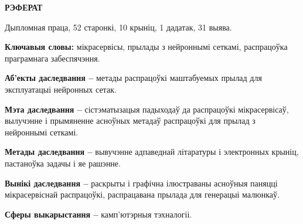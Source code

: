 \begin{center}
  \large\bfseries{РЭФЕРАТ}
\end{center}

Дыпломная праца, 52 старонкі, 10 крыніц, 1 дадатак, 31 выява.

\textbf{Ключавыя словы:} мікрасервісы, прылады з нейроннымі сеткамі, распрацоўка праграмнага забеспячэння.

\textbf{Аб'екты даследвання --} метады распрацоўкі маштабуемых прылад для эксплуатацыі нейронных сетак.

\textbf{Мэта даследвання --} сістэматызацыя падыходаў да распрацоўкі мікрасервісаў, вылучэнне і прымяненне асноўных метадаў распрацоўкі для прылад з нейроннымі сеткамі.

\textbf{Метады даследвання --} вывучэнне адпаведнай літаратуры і электронных крыніц, пастаноўка задачы і яе рашэнне.

\textbf{Вынікі даследвання --} раскрыты і графічна ілюстраваны асноўныя паняцці мікрасервіснай распрацоўкі, распрацавана прылада для генерацыі малюнкаў.

\textbf{Сферы выкарыстання --} камп'ютэрныя тэхналогіі.

\newpage